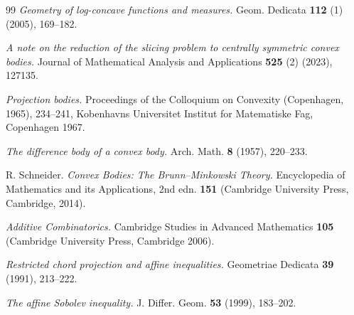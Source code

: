 \documentclass{amsart}
\theoremstyle{remark}
\theoremstyle{definition}
\numberwithin{equation}{section}
\begin{document}
\begin{thebibliography}{99}
\textit{Geometry of log-concave functions and measures.}
Geom. Dedicata {\bf 112} (1) (2005), 169--182.


\textit{A note on the reduction of the slicing problem to centrally symmetric convex bodies.}
Journal of Mathematical Analysis and Applications {\bf 525} (2) (2023), 127135.


\textit{Projection bodies.}
Proceedings of the Colloquium on Convexity (Copenhagen, 1965), 234--241, Kobenhavns Universitet Institut for Matematiske Fag, Copenhagen 1967.


\textit{The difference body of a convex body.}
Arch. Math. {\bf 8} (1957), 220--233.

 {\sc R. Schneider.}
\textit{Convex Bodies: The Brunn--Minkowski Theory.} Encyclopedia of Mathematics and its Applications, 2nd edn.
{\bf 151} (Cambridge University Press, Cambridge, 2014).

\textit{Additive Combinatorics.}
Cambridge Studies in Advanced Mathematics {\bf 105} (Cambridge University Press, Cambridge 2006).

\textit{Restricted chord projection and affine inequalities.}
Geometriae Dedicata {\bf 39} (1991), 213--222.

\textit{The affine Sobolev inequality.}
 J. Differ. Geom. {\bf 53} (1999), 183--202.


\end{thebibliography}
\end{document}
